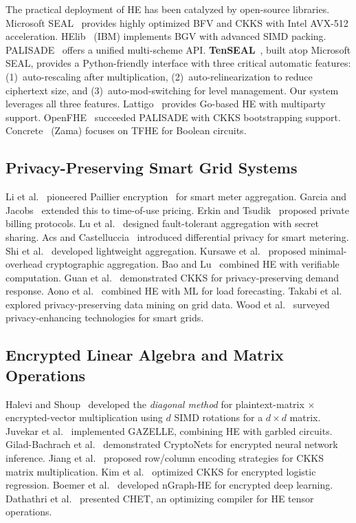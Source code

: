 \documentclass[conference,12pt]{IEEEtran}
\begin{document}
The practical deployment of HE has been catalyzed by open-source libraries. Microsoft SEAL~\cite{SEAL2022} provides highly optimized BFV and CKKS with Intel AVX-512 acceleration. HElib~\cite{Halevi2014} (IBM) implements BGV with advanced SIMD packing. PALISADE~\cite{PALISADE2021} offers a unified multi-scheme API. \textbf{TenSEAL}~\cite{Benaissa2021}, built atop Microsoft SEAL, provides a Python-friendly interface with three critical automatic features: (1)~auto-rescaling after multiplication, (2)~auto-relinearization to reduce ciphertext size, and (3)~auto-mod-switching for level management. Our system leverages all three features. Lattigo~\cite{Mouchet2020} provides Go-based HE with multiparty support. OpenFHE~\cite{OpenFHE2022} succeeded PALISADE with CKKS bootstrapping support. Concrete~\cite{Chillotti2020} (Zama) focuses on TFHE for Boolean circuits.

\subsection{Privacy-Preserving Smart Grid Systems}

Li et al.~\cite{Li2010} pioneered Paillier encryption~\cite{Paillier1999} for smart meter aggregation. Garcia and Jacobs~\cite{Garcia2011} extended this to time-of-use pricing. Erkin and Tsudik~\cite{Erkin2012} proposed private billing protocols. Lu et al.~\cite{Lu2012} designed fault-tolerant aggregation with secret sharing. Acs and Castelluccia~\cite{Acs2011} introduced differential privacy for smart metering. Shi et al.~\cite{Shi2011} developed lightweight aggregation. Kursawe et al.~\cite{Kursawe2011} proposed minimal-overhead cryptographic aggregation. Bao and Lu~\cite{Bao2015} combined HE with verifiable computation. Guan et al.~\cite{Guan2017} demonstrated CKKS for privacy-preserving demand response. Aono et al.~\cite{Aono2017} combined HE with ML for load forecasting. Takabi et al.~\cite{Takabi2016} explored privacy-preserving data mining on grid data. Wood et al.~\cite{Wood2019} surveyed privacy-enhancing technologies for smart grids.

\subsection{Encrypted Linear Algebra and Matrix Operations}

Halevi and Shoup~\cite{Halevi2014matmul} developed the \emph{diagonal method} for plaintext-matrix $\times$ encrypted-vector multiplication using $d$ SIMD rotations for a $d \times d$ matrix. Juvekar et al.~\cite{Juvekar2018} implemented GAZELLE, combining HE with garbled circuits. Gilad-Bachrach et al.~\cite{CryptoNets2016} demonstrated CryptoNets for encrypted neural network inference. Jiang et al.~\cite{Jiang2018} proposed row/column encoding strategies for CKKS matrix multiplication. Kim et al.~\cite{Kim2020} optimized CKKS for encrypted logistic regression. Boemer et al.~\cite{Boemer2019} developed nGraph-HE for encrypted deep learning. Dathathri et al.~\cite{Dathathri2019} presented CHET, an optimizing compiler for HE tensor operations.
\end{document}

